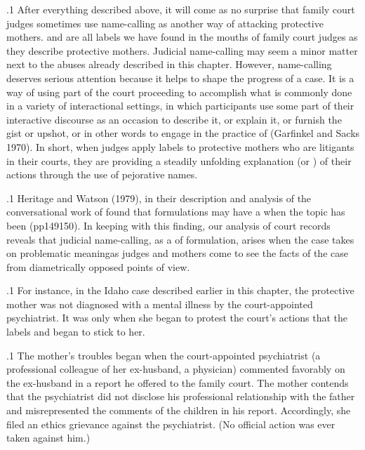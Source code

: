 \documentclass[11pt, twoside]{article}
\begin{document}
{\p.1{%
\noindent{}After everything described above, it will come as no surprise
that family court judges sometimes use name-calling as another way
of attacking protective mothers.   
 and  are all labels we have found in the mouths
of family court judges as they describe protective mothers.
Judicial name-calling may seem a minor matter next to the abuses
already described in this chapter. However, name-calling deserves serious attention because it helps to shape the progress of a case. It is
a way of using part of the court proceeding to accomplish what is
commonly done in a variety of interactional settings, in which participants use some part of their interactive discourse as an occasion
to describe it, or explain it, or furnish the gist or upshot, or in other
words to engage in the practice of  (Garfinkel and Sacks
1970). In short, when judges apply labels to protective mothers who are
litigants in their courts, they are providing a steadily unfolding explanation (or ) of their actions through the use of pejorative
names.
}%

\p.1{%
Heritage and Watson (1979), in their description and analysis of the
conversational work of  found that formulations may have
a  when the topic has been  (pp\ellThree{2pt}{2pt}149\ndash{}150). In keeping with this finding, our analysis of
court records reveals that judicial name-calling, as a  of formulation, arises when the case takes on problematic meaning\mdash{}as judges and
mothers come to see the facts of the case from diametrically opposed
points of view.
}%

\p.1{%
For instance, in the Idaho case described earlier in this chapter, the
protective mother was not diagnosed with a mental illness by
the court-appointed psychiatrist. It was only when she began to protest the court’s
actions that the labels  and  began to stick to her.
}%

\p.1{%
The mother’s troubles began when the court-appointed psychiatrist (a
professional colleague of her ex-husband, a physician) commented favorably on the ex-husband in a  report he offered to the
family court. The mother contends that the psychiatrist did not disclose his professional relationship with the father and misrepresented
the comments of the children in his report. Accordingly, she filed an
ethics grievance against the psychiatrist. (No official action was ever
taken against him.)
}%

}
\end{document}
